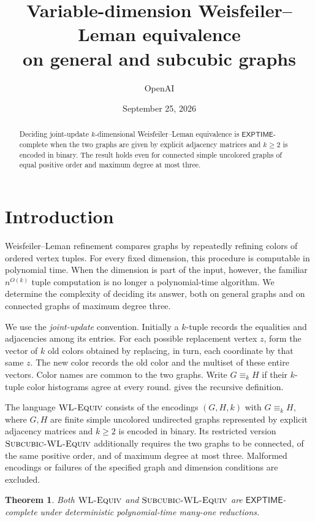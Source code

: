 \documentclass[11pt]{article}
\title{Variable-dimension Weisfeiler--Leman equivalence\\on general and subcubic graphs}
\author{OpenAI}
\date{September 25, 2026}
\newtheorem{theorem}{Theorem}[section]
\theoremstyle{definition}
\newcommand{\EXPTIME}{\mathsf{EXPTIME}}
\newcommand{\WL}{\textnormal{\textsc{WL-Equiv}}}
\newcommand{\SubWL}{\textnormal{\textsc{Subcubic-WL-Equiv}}}
\begin{document}
\maketitle
\begin{abstract}
Deciding joint-update \(k\)-dimensional Weisfeiler--Leman equivalence is
\(\EXPTIME\)-complete when the two graphs are given by explicit adjacency
matrices and \(k\ge2\) is encoded in binary. The result holds even for
connected simple uncolored graphs of equal positive order and maximum
degree at most three.
\end{abstract}
{\footnotesize\tableofcontents}
\section{Introduction}\label{sec:introduction}

Weisfeiler--Leman refinement compares graphs by repeatedly refining colors
of ordered vertex tuples. For every fixed dimension, this procedure is
computable in polynomial time. When the dimension is part of the input,
however, the familiar \(n^{O(k)}\) tuple computation is no longer a
polynomial-time algorithm. We determine the complexity of deciding its
answer, both on general graphs and on connected graphs of maximum degree
three.

We use the \emph{joint-update} convention. Initially a \(k\)-tuple records
the equalities and adjacencies among its entries. For each possible
replacement vertex \(z\), form the vector of \(k\) old colors obtained by
replacing, in turn, each coordinate by that same \(z\). The new color
records the old color and the multiset of these entire vectors. Color
names are common to the two graphs. Write \(G\equiv_k H\) if their
\(k\)-tuple color histograms agree at every round.
 gives the recursive definition.

The language \(\WL\) consists of the encodings \((G,H,k)\) with
\(G\equiv_k H\), where \(G,H\) are finite simple uncolored undirected
graphs represented by explicit adjacency matrices and \(k\ge2\) is
encoded in binary. Its restricted version \(\SubWL\) additionally
requires the two graphs to be connected, of the same positive order,
and of maximum degree at most three. Malformed encodings or failures
of the specified graph and dimension conditions are excluded.

\begin{theorem}\label{thm:main}
Both \(\WL\) and \(\SubWL\) are \(\EXPTIME\)-complete under deterministic
polynomial-time many-one reductions.
\end{theorem}
\end{document}
